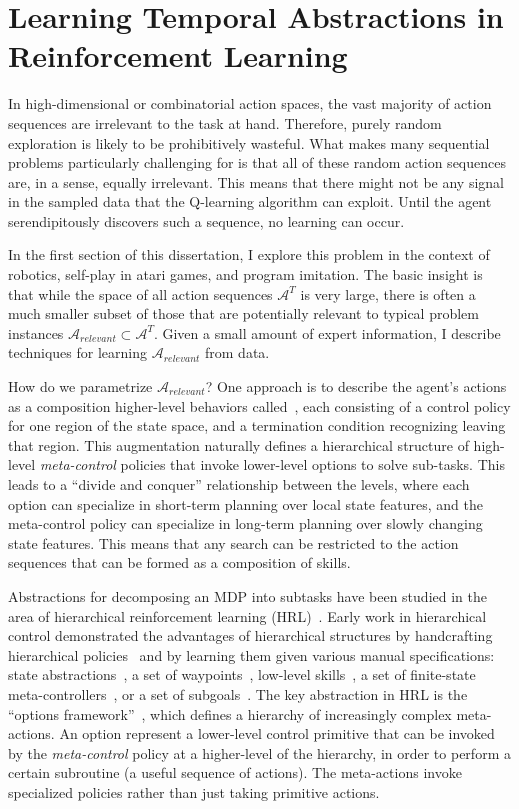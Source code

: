 \chapter{Learning Temporal Abstractions in Reinforcement Learning}
\setcounter{secnumdepth}{1}
In high-dimensional or combinatorial action spaces, the vast majority of action sequences are irrelevant to the task at hand.
Therefore, purely random exploration is likely to be prohibitively wasteful.
What makes many sequential problems particularly challenging for is that all of these random action sequences are, in a sense, equally irrelevant. 
This means that there might not be any signal in the sampled data that the Q-learning algorithm can exploit.
Until the agent serendipitously discovers such a sequence, no learning can occur.

In the first section of this dissertation, I explore this problem in the context of robotics, self-play in atari games, and program imitation. 
The basic insight is that while the space of all action sequences $\mathcal{A}^T$ is very large, there is often a much smaller subset of those that are potentially relevant to typical problem instances $\mathcal{A}_{relevant} \subset \mathcal{A}^T$. 
Given a small amount of expert information, I describe techniques for learning $\mathcal{A}_{relevant}$ from data.

How do we parametrize $\mathcal{A}_{relevant}$?
One approach is to describe the agent's actions as a composition higher-level behaviors called~\cite{suttonPS99}, each consisting of a control policy for one region of the state space, and a termination condition recognizing leaving that region. This augmentation naturally defines a hierarchical structure of high-level \emph{meta-control} policies that invoke lower-level options to solve sub-tasks.
This leads to a ``divide and conquer'' relationship between the levels, where each option can specialize in short-term planning over local state features, and the meta-control policy can specialize in long-term planning over slowly changing state features.
This means that any search can be restricted to the action sequences that can be formed as a composition of skills.


Abstractions for decomposing an MDP into subtasks have been studied in the area of hierarchical reinforcement learning (HRL)~\cite{parr98,suttonPS99,barto03}.
Early work in hierarchical control demonstrated the advantages of hierarchical structures by handcrafting hierarchical policies~\cite{brooks1986robust} and by learning them given various manual specifications: state abstractions~\cite{dayanH92,hengst02,kolterAN07,konidarisB07}, a set of waypoints~\cite{kaelbling93}, low-level skills~\cite{huberG97,baconP15,liaw17composing}, a set of finite-state meta-controllers~\cite{parrR97}, or a set of subgoals~\cite{suttonPS99,dietterich00}.
The key abstraction in HRL is the ``options framework''~\cite{suttonPS99}, which defines a hierarchy of increasingly complex meta-actions.
 An option represent a lower-level control primitive that can be invoked by the \emph{meta-control} policy at a higher-level of the hierarchy, in order to perform a certain subroutine (a useful sequence of actions).
The meta-actions invoke specialized policies rather than just taking primitive actions.

